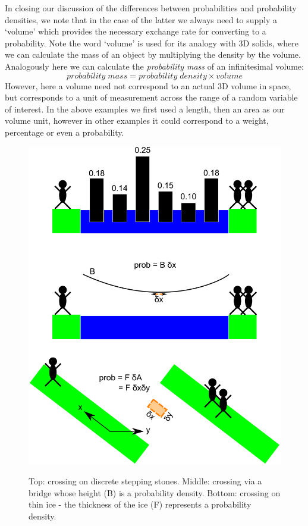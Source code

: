 \documentclass[11pt,fullpage]{book}
\begin{document}
In closing our discussion of the differences between probabilities and probability densities, we note that in the case of the latter we always need to supply a `volume' which provides the necessary exchange rate for converting to a probability. Note the word `volume' is used for its analogy with 3D solids, where we can calculate the mass of an object by multiplying the density by the volume. Analogously here we can calculate the \textit{probability mass} of an infinitesimal volume:
%
\begin{equation}
probability\; mass = probability\; density \times volume
\end{equation}
%
However, here a volume need not correspond to an actual 3D volume in space, but corresponds to a unit of measurement across the range of a random variable of interest. In the above examples we first used a length, then an area as our volume unit, however in other examples it could correspond to a weight, percentage or even a probability.

\begin{figure}
\centering
\scalebox{0.2} 
{\includegraphics{Probability_riverCrossing.pdf}}
\caption{Top: crossing on discrete stepping stones. Middle: crossing via a bridge whose height (B) is a probability density. Bottom: crossing on thin ice - the thickness of the ice (F) represents a probability density.}\label{fig:Probability_riverCrossing}
\end{figure}
\end{document}
